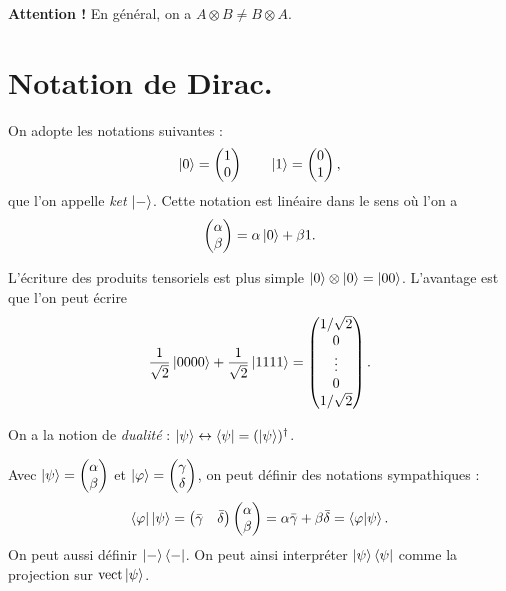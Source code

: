 \documentclass[./main]{subfiles}
\begin{document}
  \textbf{Attention !} En général, on a $A \otimes B \neq B \otimes A$.

  \section{Notation de Dirac.}

  On adopte les notations suivantes :
  \[
  \ket 0 = \begin{pmatrix} 1 \\ 0 \end{pmatrix}
  \quad\quad
  \ket 1 = \begin{pmatrix} 0 \\ 1 \end{pmatrix}
  ,\]
  que l'on appelle \textit{ket} $\ket -$.
  Cette notation est linéaire dans le sens où l'on a 
  \[
  \begin{pmatrix} \alpha \\ \beta \end{pmatrix} = \alpha \ket 0 + \beta 1
  .\]
  
  L'écriture des produits tensoriels est plus simple $\ket 0 \otimes \ket 0 = \ket{00}$.
  L'avantage est que l'on peut écrire \[
    \frac{1}{\sqrt{2} } \ket{0000} + \frac{1}{\sqrt{2}} \ket{1111} = \begin{pmatrix} 1/\sqrt{2} \\ 0 \\ \vdots \\ 0 \\ 1/\sqrt{2} \end{pmatrix} 
  .\]

  On a la notion de \textit{dualité} : $\ket \psi \leftrightarrow \bra \psi = (\ket \psi)^\dagger$.

  Avec $\ket \psi = \begin{pmatrix} \alpha \\ \beta \end{pmatrix}$ et $\ket \varphi = \begin{pmatrix} \gamma \\ \delta \end{pmatrix}$, on peut définir des notations sympathiques :
  \[
  \bra \varphi \ket \psi = \begin{pmatrix} \bar{\gamma} & \bar{\delta} \end{pmatrix} \begin{pmatrix} \alpha \\ \beta \end{pmatrix} = \alpha \bar{\gamma} + \beta \bar{\delta} = \braket{\varphi | \psi} 
  .\] 
  On peut aussi définir $\ket- \bra -$. On peut ainsi interpréter  $\ket \psi \bra \psi$ comme la projection sur  $\operatorname{vect} \ket \psi$.
\end{document}

